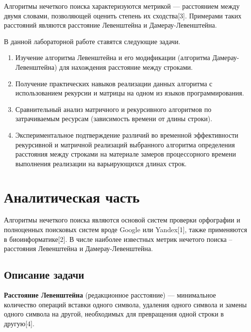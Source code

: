 \documentclass[a4paper,14pt]{article} %
\begin{document}
        \hfill
        
        Алгоритмы нечеткого поиска характеризуются метрикой — расстоянием между двумя словами, позволяющей оценить степень их сходства[3]. Примерами таких расстояний являются расстояние Левенштейна и Дамерау-Левенштейна. 
        
        \hfill
        
        В данной лабораторной работе ставятся следующие задачи. 
        \begin{enumerate} 
		\item Изучение алгоритма Левенштейна и его модификации (алгоритма Дамерау-Левенштейна) для нахождения расстояние между строками. 
		\item Получение практических навыков реализации данных алгоритма с использованием рекурсии и матрицы на одном из языков программирования. 
		\item Сравнительный анализ матричного и рекурсивного алгоритмов по затрачиваемым ресурсам (зависимость времени от длины строки). 
		\item Экспериментальное подтверждение различий во временной эффективности рекурсивной и матричной реализаций выбранного алгоритма определения расстояния между строками на материале замеров процессорного времени выполнения реализации на варьирующихся длинах строк.
	\end{enumerate} 
	
	\newpage


        \section{Аналитическая часть}
        \hfill
        
        Алгоритмы нечеткого поиска являются основой систем проверки орфографии и полноценных поисковых систем вроде Google или Yandex[1], также применяются в биоинформатике[2]. В числе наиболее известных метрик нечетого поиска -- расстояния Левенштейна и Дамерау-Левенштейна. 
        
        \subsection{Описание задачи}
        \hfill
        
        \textbf{Расстояние Левенштейна}  (редакционное расстояние) — минимальное количество операций вставки одного символа, удаления одного символа и замены одного символа на другой, необходимых для превращения одной строки в другую[4].
        
\end{document}
